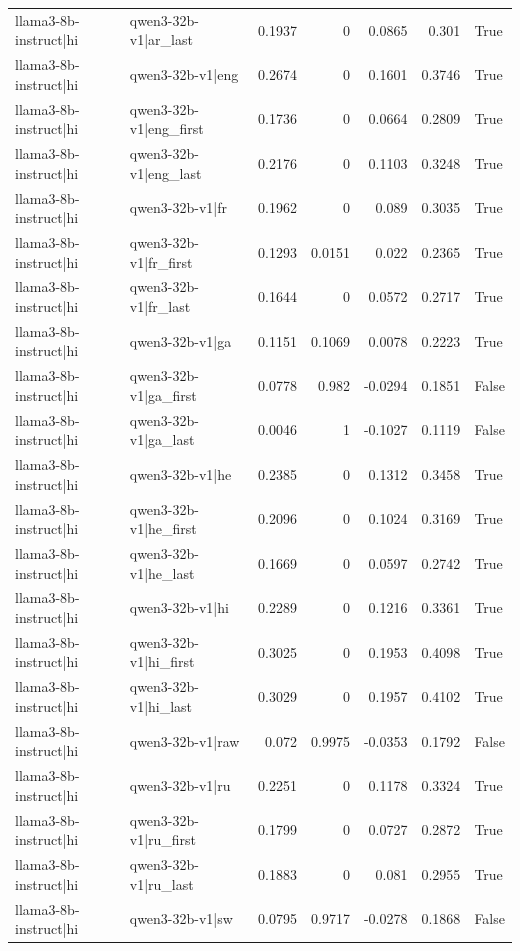 \begin{table}
\begin{tabular}{l l r r r r l}
llama3-8b-instruct|hi & qwen3-32b-v1|ar_last & 0.1937 & 0 & 0.0865 & 0.301 & True \\
llama3-8b-instruct|hi & qwen3-32b-v1|eng & 0.2674 & 0 & 0.1601 & 0.3746 & True \\
llama3-8b-instruct|hi & qwen3-32b-v1|eng_first & 0.1736 & 0 & 0.0664 & 0.2809 & True \\
llama3-8b-instruct|hi & qwen3-32b-v1|eng_last & 0.2176 & 0 & 0.1103 & 0.3248 & True \\
llama3-8b-instruct|hi & qwen3-32b-v1|fr & 0.1962 & 0 & 0.089 & 0.3035 & True \\
llama3-8b-instruct|hi & qwen3-32b-v1|fr_first & 0.1293 & 0.0151 & 0.022 & 0.2365 & True \\
llama3-8b-instruct|hi & qwen3-32b-v1|fr_last & 0.1644 & 0 & 0.0572 & 0.2717 & True \\
llama3-8b-instruct|hi & qwen3-32b-v1|ga & 0.1151 & 0.1069 & 0.0078 & 0.2223 & True \\
llama3-8b-instruct|hi & qwen3-32b-v1|ga_first & 0.0778 & 0.982 & -0.0294 & 0.1851 & False \\
llama3-8b-instruct|hi & qwen3-32b-v1|ga_last & 0.0046 & 1 & -0.1027 & 0.1119 & False \\
llama3-8b-instruct|hi & qwen3-32b-v1|he & 0.2385 & 0 & 0.1312 & 0.3458 & True \\
llama3-8b-instruct|hi & qwen3-32b-v1|he_first & 0.2096 & 0 & 0.1024 & 0.3169 & True \\
llama3-8b-instruct|hi & qwen3-32b-v1|he_last & 0.1669 & 0 & 0.0597 & 0.2742 & True \\
llama3-8b-instruct|hi & qwen3-32b-v1|hi & 0.2289 & 0 & 0.1216 & 0.3361 & True \\
llama3-8b-instruct|hi & qwen3-32b-v1|hi_first & 0.3025 & 0 & 0.1953 & 0.4098 & True \\
llama3-8b-instruct|hi & qwen3-32b-v1|hi_last & 0.3029 & 0 & 0.1957 & 0.4102 & True \\
llama3-8b-instruct|hi & qwen3-32b-v1|raw & 0.072 & 0.9975 & -0.0353 & 0.1792 & False \\
llama3-8b-instruct|hi & qwen3-32b-v1|ru & 0.2251 & 0 & 0.1178 & 0.3324 & True \\
llama3-8b-instruct|hi & qwen3-32b-v1|ru_first & 0.1799 & 0 & 0.0727 & 0.2872 & True \\
llama3-8b-instruct|hi & qwen3-32b-v1|ru_last & 0.1883 & 0 & 0.081 & 0.2955 & True \\
llama3-8b-instruct|hi & qwen3-32b-v1|sw & 0.0795 & 0.9717 & -0.0278 & 0.1868 & False \\

\end{tabular}
\end{table}

